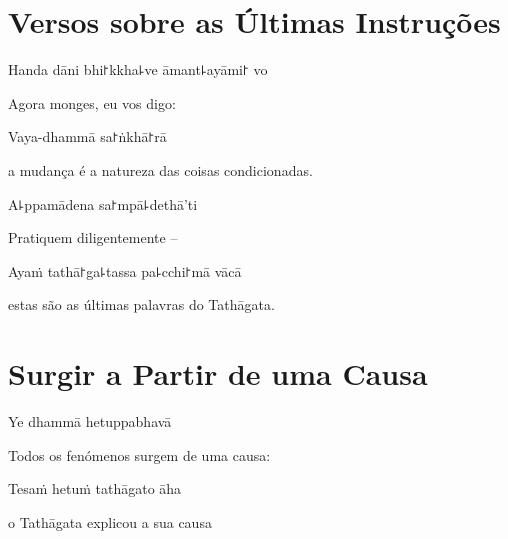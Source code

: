 \chapter[As Últimas Instruções]{Versos sobre as Últimas Instruções}


\begin{leader}
\end{leader}

Handa dāni bhi꜓kkha꜕ve āmant꜕ayāmi꜓ vo

\begin{english}
  Agora monges, eu vos digo:
\end{english}

Vaya-dhammā sa꜓ṅkhā꜓rā

\begin{english}
  a mudança é a natureza das coisas condicionadas.
\end{english}

A꜕ppamādena sa꜓mpā꜕dethā'ti

\begin{english}
  Pratiquem diligentemente --
\end{english}

Ayaṁ tathā꜓ga꜕tassa pa꜕cchi꜓mā vācā

\begin{english}
  estas são as últimas palavras do Tathāgata.
\end{english}

\chapter{Surgir a Partir de uma Causa}


\begin{leader}
\end{leader}

Ye dhammā hetuppabhavā

\begin{english}
  Todos os fenómenos surgem de uma causa:
\end{english}

Tesaṁ hetuṁ tathāgato āha

\begin{english}
  o Tathāgata explicou a sua causa
\end{english}

